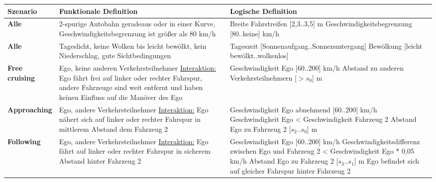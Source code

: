 \begin{longtable}[c]{p{2.5cm} p{5.5cm} p{5.5cm}}
\textbf{Szenario} & \textbf{Funktionale Definition} & \textbf{Logische Definition} \\
\hline
\endhead

\textbf{Alle} & 2-spurige Autobahn geradeaus oder in einer Kurve, Geschwindigkeitsbegrenzung ist größer als 80 km/h & Breite Fahrstreifen [2,3..3,5] m \newline Geschwindigkeitsbegrenzung [80..keine] km/h \\
\hline

\textbf{Alle} & Tageslicht, keine Wolken bis leicht bewölkt, kein Niederschlag, gute Sichtbedingungen & Tageszeit [Sonnenaufgang..Sonnenuntergang] \newline Bewölkung [leicht bewölkt..wolkenlos]\\
\hline \hline

\textbf{Free cruising} & Ego, keine anderen Verkehrsteilnehmer \newline \underline{Interaktion:} Ego fährt frei auf linker oder rechter Fahrspur, andere Fahrzeuge sind weit entfernt und haben keinen Einfluss auf die Manöver des Ego & Geschwindigkeit Ego [60..200] km/h \newline Abstand zu anderen Verkehrsteilnehmern [$>s_0$] m \\
\hline

\textbf{Approaching} & Ego, andere Verkehrsteilnehmer \newline \underline{Interaktion:} Ego nähert sich auf linker oder rechter Fahrspur in mittlerem Abstand dem Fahrzeug 2 & Geschwindigkeit Ego abnehmend [60..200] km/h \newline Geschwindigkeit Ego < Geschwindigkeit Fahrzeug 2 \newline Abstand Ego zu Fahrzeug 2 [$s_2$..$s_0$] m \\
\hline

\textbf{Following} & Ego, andere Verkehrsteilnehmer \newline \underline{Interaktion:} Ego fährt auf linker oder rechter Fahrspur in sicherem Abstand hinter Fahrzeug 2 & Geschwindigkeit Ego [60..200] km/h \newline Geschwindigkeitsdifferenz zwischen Ego und Fahrzeug 2 < Geschwindigkeit Ego * 0,05 km/h \newline Abstand Ego zu Fahrzeug 2 [$s_3$..$s_1$] m \newline Ego befindet sich auf gleicher Fahrspur hinter Fahrzeug 2 \\
\hline


\end{longtable}
